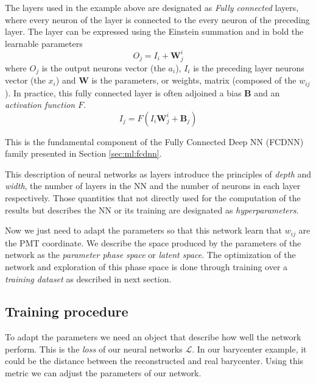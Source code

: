 \documentclass[../main.tex]{subfiles}
\begin{document}
The layers used in the example above are designated as \textit{Fully connected} layers, where every neuron of the layer is connected to the every neuron of the preceding layer. The layer can be expressed using the Einstein summation and in bold the learnable parameters
\begin{equation}
  \label{eq:ml:fully-connected-simple}
  O_{j} = I_{i} + \bm{W}_{j}^{i}
\end{equation}
where $O_{j}$ is the output neurons vector (the $a_i$), $I_{i}$ is the preceding layer neurons vector (the $x_i$) and $\bm{W}$ is the parameters, or weights, matrix (composed of the $w_{ij}$).
In practice, this fully connected layer is often adjoined a bias $\bm{B}$ and an \textit{activation function} $F$.
\begin{equation}
  \label{eq:ml:fully-connected}
  I_{j} = F(I_{i} \bm{W}_{j}^{i} + \bm{B}_j)
\end{equation}

This is the fundamental component of the Fully Connected Deep NN (FCDNN) family presented in Section \ref{sec:ml:fcdnn}.

This description of neural networks as layers introduce the principles of \textit{depth} and \textit{width}, the number of layers in the NN and the number of neurons in each layer respectively. Those quantities that not directly used for the computation of the results but describes the NN or its training are designated as \textit{hyperparameters}.

Now we just need to adapt the parameters so that this network learn that $w_{ij}$ are the PMT coordinate. We describe the space produced by the parameters of the network as the \textit{parameter phase space} or \textit{latent space}. The optimization of the network and exploration of this phase space is done through training over a \textit{training dataset} as described in next section.

\subsection{Training procedure}
\label{sec:ml:train}

To adapt the parameters we need an object that describe how well the network perform. This is the \textit{loss} of our neural networks $\mathcal{L}$. In our barycenter example, it could be the distance between the reconstructed and real barycenter. Using this metric we can adjust the parameters of our network.
\end{document}
